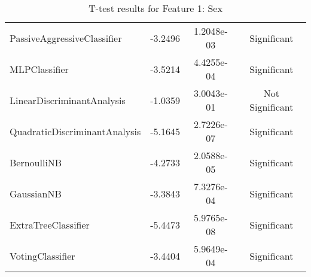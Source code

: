 \begin{table*}[htbp]
\begin{tabular}{lccc}
PassiveAggressiveClassifier     & -3.2496 & 1.2048e-03 & Significant \\
MLPClassifier                   & -3.5214 & 4.4255e-04 & Significant \\
LinearDiscriminantAnalysis      & -1.0359 & 3.0043e-01 & Not Significant \\
QuadraticDiscriminantAnalysis   & -5.1645 & 2.7226e-07 & Significant \\
BernoulliNB                     & -4.2733 & 2.0588e-05 & Significant \\
GaussianNB                      & -3.3843 & 7.3276e-04 & Significant \\
ExtraTreeClassifier             & -5.4473 & 5.9765e-08 & Significant \\
VotingClassifier                & -3.4404 & 5.9649e-04 & Significant \\
\bottomrule
\end{tabular}
\caption{T-test results for Feature 1: Sex}
\end{table*}


